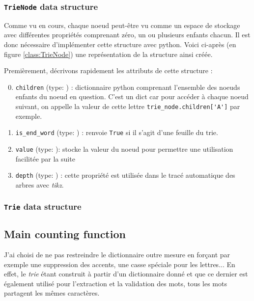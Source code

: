 \documentclass[10pt,a4paper,hidelinks]{article}
\newcommand{\colorverb}[2]{\textcolor{#1}{\texttt{\detokenize{#2}}}}
\newcommand{\type}[1]{\colorverb{green!50!black}{#1}}
\begin{document}
\subsubsection{\texttt{TrieNode} data structure}

Comme vu en cours, chaque noeud peut-être vu comme un espace de stockage avec différentes propriétés comprenant zéro, un ou plusieurs enfants chacun. Il est donc nécessaire d'implémenter cette structure avec python. Voici ci-après (en figure \ref{class:TrieNode}) une représentation de la structure ainsi créée.

Premièrement, décrivons rapidement les attributs de cette structure :
\begin{enumerate}
    \setcounter{enumi}{-1}
    \item \verb|children| (type: \type{dict[TrieNode]}) : dictionnaire python comprenant l'ensemble des noeuds enfants du noeud en question. C'est un dict car pour accéder à chaque noeud suivant, on appelle la valeur de cette lettre \verb|trie_node.children['A']| par exemple.
    \item \verb|is_end_word| (type: \type{int}) : renvoie \verb|True| si il s'agit d'une feuille du trie.
    \item \verb|value| (type: \type{str}): stocke la valeur du noeud pour permettre une utilisation facilitée par la suite
    \item \verb|depth| (type: \type{int}) : cette propriété est utilisée dans le tracé automatique des arbres avec \textit{tikz}.
\end{enumerate}

\subsubsection{\texttt{Trie} data structure}


\subsection{Main counting function}
J'ai choisi de ne pas restreindre le dictionnaire outre mesure en forçant par exemple une suppression des accents, une casse spéciale pour les lettres... En effet, le \textit{trie} étant construit à partir d'un dictionnaire donné et que ce dernier est également utilisé pour l'extraction et la validation des mots, tous les mots partagent les mêmes caractères.
\end{document}
